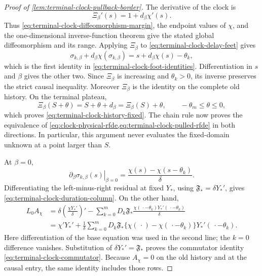 \begin{proof}[Proof of
\cref{lem:terminal-clock-pullback-border}]
The derivative of the clock is
\[
 \Xi_\beta'(s)=1+d_\beta\chi'(s).
\]
Thus \cref{eq:terminal-clock-diffeomorphism-margin}, the endpoint values of
\(\chi\), and the one-dimensional inverse-function theorem give the stated
global diffeomorphism and its range.  Applying \(\Xi_\beta\) to
\cref{eq:terminal-clock-delay-feet} gives
\[
 \sigma_{k,\beta}+d_\beta\chi(\sigma_{k,\beta})
 =s+d_\beta\chi(s)-\theta_k,
\]
which is the first identity in
\cref{eq:terminal-clock-foot-identities}.  Differentiation in \(s\) and
\(\beta\) gives the other two.  Since \(\Xi_\beta\) is increasing and
\(\theta_k>0\), its inverse preserves the strict causal inequality.
Moreover \(\Xi_\beta\) is the identity on the complete old history.  On
the terminal plateau,
\[
 \Xi_\beta(S+\theta)=S+\theta+d_\beta
                    =\Xi_\beta(S)+\theta,
 \qquad-\theta_m\le\theta\le0,
\]
which proves \cref{eq:terminal-clock-history-fixed}.  The chain rule now
proves the equivalence of
\cref{eq:clock-physical-rfde,eq:terminal-clock-pulled-rfde} in both
directions.  In particular, this argument never evaluates the fixed-domain
unknown at a point larger than \(S\).

At \(\beta=0\),
\begin{equation}
 \left.\partial_\beta\sigma_{k,\beta}(s)\right|_{\beta=0}
 =\frac{\chi(s)-\chi(s-\theta_k)}{\delta}.       \label{eq:proof-clock-foot-derivative}
\end{equation}
Differentiating the left-minus-right residual at fixed \(Y_*\), using
\(\mathfrak F_*=\delta Y_*'\), gives
\cref{eq:terminal-clock-duration-column}.  On the other hand,
\begin{align*}
 L_0 A_\chi
 &=
 \delta\left(\frac{\chi Y_*'}{\delta}\right)'
 -\sum_{k=0}^mD_k\mathfrak F_*
       \frac{\chi(\,\cdot-\theta_k)Y_*'(\,\cdot-\theta_k)}
            {\delta}\\
 &=\chi'Y_*'
 +\frac1\delta\sum_{k=0}^mD_k\mathfrak F_*
       \{\chi(\,\cdot)-\chi(\,\cdot-\theta_k)\}
                  Y_*'(\,\cdot-\theta_k).
\end{align*}
Here differentiation of the base equation was used in the second line;
the \(k=0\) difference vanishes.  Substitution of
\(\delta Y_*'=\mathfrak F_*\) proves the commutator identity
\cref{eq:terminal-clock-commutator}.  Because \(A_\chi=0\) on the old
history and at the causal entry, the same identity includes those rows.


\end{proof}
